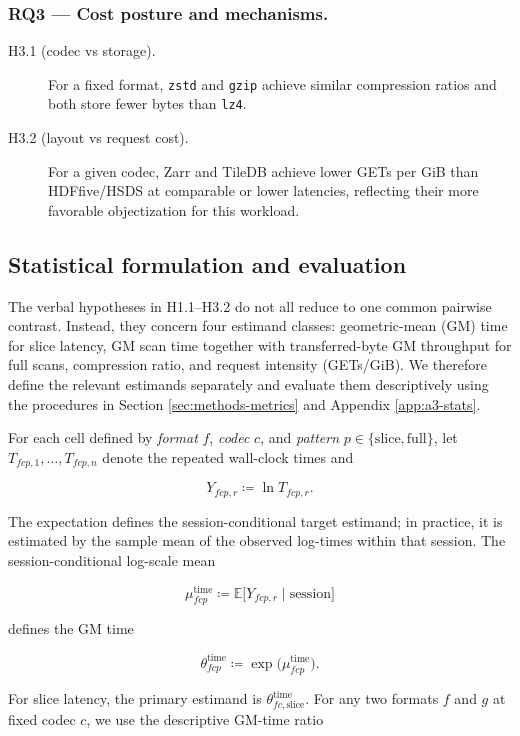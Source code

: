 \documentclass[nomenclature, english, bibtex]{kththesis}
\numberwithin{listing}{chapter}
\begin{document}
\subsubsection{RQ3 — Cost posture and mechanisms.}
\begin{description}
  \item[H3.1 (codec vs storage).] For a fixed format, \texttt{zstd} and \texttt{gzip} achieve similar compression ratios and both store fewer bytes than \texttt{lz4}.
  \item[H3.2 (layout vs request cost).] For a given codec, Zarr and TileDB achieve lower GETs per GiB than \gls{HDFfive}/\gls{HSDS} at comparable or lower latencies, reflecting their more favorable objectization for this workload.
\end{description}

\subsection{Statistical formulation and evaluation}
\label{sec:methods-statistical-hypotheses}
The verbal hypotheses in H1.1--H3.2 do not all reduce to one common pairwise contrast. Instead, they concern four estimand classes: geometric-mean (\gls{GM}) time for slice latency, \gls{GM} scan time together with transferred-byte \gls{GM} throughput for full scans, compression ratio, and request intensity (GETs/GiB). We therefore define the relevant estimands separately and evaluate them descriptively using the procedures in Section \ref{sec:methods-metrics} and Appendix \ref{app:a3-stats}.

For each cell defined by \emph{format} $f$, \emph{codec} $c$, and \emph{pattern} $p\in\{\text{slice},\text{full}\}$, let $T_{fcp,1},\dots,T_{fcp,n}$ denote the repeated wall-clock times and

\[
Y_{fcp,r} \coloneqq \ln T_{fcp,r}.
\]

The expectation defines the session-conditional target estimand; in practice, it is estimated by the sample mean of the observed log-times within that session. The session-conditional log-scale mean

\[
\mu^{\mathrm{time}}_{fcp} \coloneqq \mathbb{E}\bigl[Y_{fcp,r}\mid\text{session}\bigr]
\]

defines the \gls{GM} time

\[
\theta^{\mathrm{time}}_{fcp} \coloneqq \exp\!\bigl(\mu^{\mathrm{time}}_{fcp}\bigr).
\]

For slice latency, the primary estimand is $\theta^{\mathrm{time}}_{fc,\text{slice}}$. For any two formats $f$ and $g$ at fixed codec $c$, we use the descriptive \gls{GM}-time ratio
\end{document}
